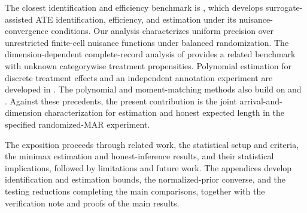 The closest identification and efficiency benchmark is \citet[Lemma~1.1 under Assumptions~1--3, Theorem~2.1, and Sections~3--4]{KallusMao2025}, which develops surrogate-assisted ATE identification, efficiency, and estimation under its nuisance-convergence conditions. Our analysis characterizes uniform precision over unrestricted finite-cell nuisance functions under balanced randomization. The dimension-dependent complete-record analysis of \citet[Theorems~1--2 and Appendix~C.5]{ZengBalakrishnanHanKennedy2024} provides a related benchmark with unknown categorywise treatment propensities. Polynomial estimation for discrete treatment effects and an independent annotation experiment are developed in \citet{CausalSmith2026,CausalSmith2026Annotation}. The polynomial and moment-matching methods also build on \citet[Sections~III--IV]{JiaoVenkatHanWeissman2015} and \citet[Proposition~3 and Appendix~B.2]{WuYang2016}. Against these precedents, the present contribution is the joint arrival-and-dimension characterization for estimation and honest expected length in the specified randomized-MAR experiment.

The exposition proceeds through related work, the statistical setup and criteria, the minimax estimation and honest-inference results, and their statistical implications, followed by limitations and future work. The appendices develop identification and estimation bounds, the normalized-prior converse, and the testing reductions completing the main comparisons, together with the verification note and proofs of the main results.
